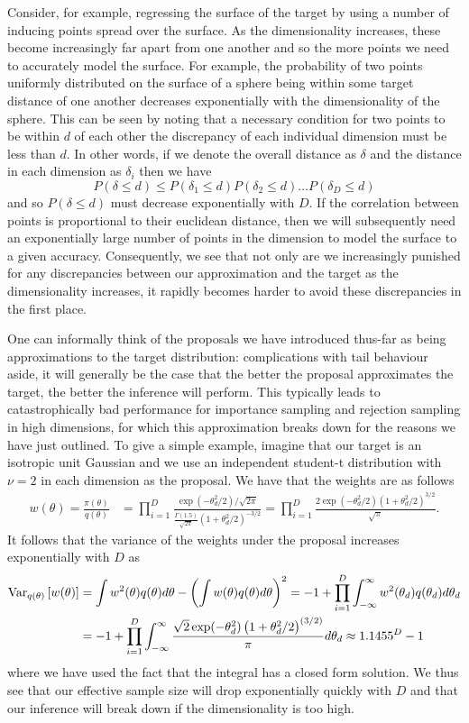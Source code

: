 Consider, for example,
regressing the surface of the target by using a number of inducing points spread over the
surface.  As the dimensionality increases, these become increasingly far apart from one
another and so the more points we need to accurately model the surface.  For example, the
probability of two points uniformly distributed on the surface of a sphere being within
some target distance of one another decreases exponentially
with the dimensionality of the sphere.  This can be seen by noting that a necessary condition
for two points to be within $d$ of each other the discrepancy of each individual dimension 
must be less than $d$.  In other words, if we denote the overall distance as $\delta$ and 
the distance in each dimension as $\delta_i$ then we have 
\[
P(\delta \le d)\le P(\delta_1 \le d)  P(\delta_2 \le d)  \dots  P(\delta_D \le d) 
\]
and so $P(\delta \le d)$ must decrease exponentially with $D$.  
If the correlation between points is proportional to their euclidean distance, then
we will subsequently need an exponentially large number of points in the dimension
to model the surface to a given accuracy.  Consequently, we see that not only are we
increasingly punished for any discrepancies between our approximation and the target
as the dimensionality increases, it rapidly becomes harder to avoid these discrepancies
in the first place.

One can informally think of the proposals we have introduced thus-far as being
approximations to the target distribution: complications with tail behaviour aside, it will
generally be the case that the better the proposal approximates the target, the better the
inference will perform.  This typically leads to catastrophically bad performance for
importance sampling and rejection sampling in high dimensions, for which this approximation
breaks down for the reasons we have just outlined.  To give a simple example, imagine that
our target is an isotropic unit Gaussian and we use an independent student-t distribution
with $\nu=2$ in each dimension as the proposal.  We have that the weights are as follows
\begin{align}
w(\theta) = \frac{\pi(\theta)}{q(\theta)} &= \prod_{i=1}^{D} \frac{\exp(-\theta_d^2/2)/\sqrt{2\pi}}
{\frac{\Gamma(1.5)}{\sqrt{2\pi}}\left(1+\theta_d^2/2\right)^{-3/2} } =\prod_{i=1}^{D} \frac{2 \exp(-\theta_d^2/2) \left(1+\theta_d^2/2\right)^{3/2}}{\sqrt{\pi}}.
\end{align}
It follows that the variance of the weights under the proposal increases exponentially
with $D$ as
\begin{align}
\mathrm{Var}_{q(\theta)} \left[w(\theta)\right] &= \int w^2(\theta)q(\theta)d\theta -
\left(\int w(\theta)q(\theta)d\theta\right)^2 
=-1+ \prod_{i=1}^{D} \int_{-\infty}^{\infty} w^2(\theta_d)q(\theta_d)d\theta_d \nonumber\\
&=-1+\prod_{i=1}^{D} \int_{-\infty}^{\infty} \frac{\sqrt{2}\exp(-\theta_d^2)\left(1+\theta^2_d/2\right)^{(3/2)}}
{\pi}d\theta_d \approx 1.1455^D-1
\end{align}
where we have used the fact that the integral has a closed form solution.
We thus see that our effective sample size
will drop exponentially quickly with $D$ and that our inference will break down if
the dimensionality is too high.

